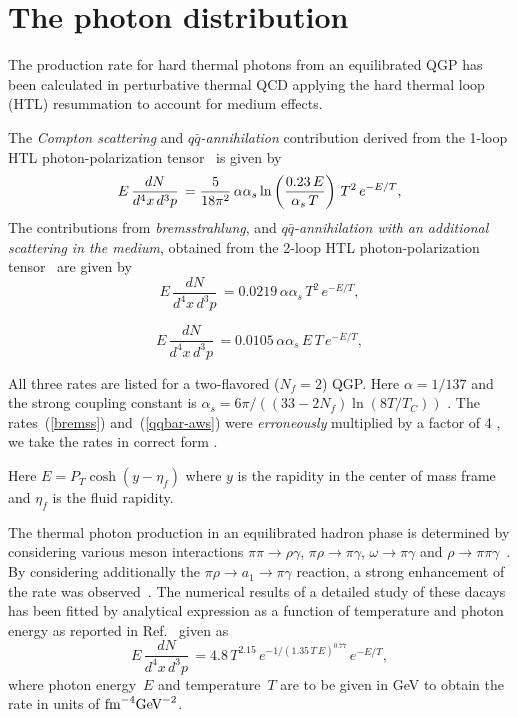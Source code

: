 \documentclass[aps,prc,preprint,superscriptaddress,showpacs,showkeys]{revtex4-1}
\begin{document}
\section{The photon distribution}

  The production rate for hard thermal photons from an equilibrated 
QGP has been calculated in
perturbative thermal QCD applying the hard thermal loop (HTL)
resummation to account for medium effects. 


The {\em Compton scattering} and {\em $q\bar{q}$-annihilation} contribution
derived from the 1-loop HTL photon-polarization 
tensor~\cite{KAPUSTA_1991,BAIER_1991,TRAXLER_1995} is given by
%
\begin{equation} 
 E\,\frac{dN}{d^4x\,d^3p} \, =  {5\over 18 \pi^2}\,\alpha \alpha_s 
       \ln \left(\frac{0.23\,E}{\alpha_s\,T}\right)
            \,T^2\,e^{-E/T},
\label{1-loop}
\end{equation}
%
The contributions from {\em bremsstrahlung}, 
and {\em $q\bar{q}$-annihilation with an additional scattering in the medium},
obtained from the 2-loop HTL photon-polarization
tensor~\cite{AURENCHE_1998,THOMA} are given by
%
\begin{equation} 
   E\,\frac{dN}{d^4x\,d^3p} \, = 
        0.0219\,\alpha \alpha_s
        \,T^2\,e^{-E/T},
\label{bremss}
\end{equation}
%

%
\begin{equation} 
      E\,\frac{dN}{d^4x\,d^3p} \, =  
        0.0105\,\alpha \alpha_s
        \,E\,T\,e^{-E/T},
\label{qqbar-aws}
\end{equation}
%

All three rates are listed for a two-flavored
($N_f = 2$) QGP. Here $\alpha=1/137$ and the strong coupling constant is 
$\alpha_s= 6\pi/((33-2N_f) \ln(8T/T_C))$ \cite{KARSCH}.
The rates~(\ref{bremss}) and~(\ref{qqbar-aws}) were 
{\em erroneously} multiplied 
by a factor of 4 \cite{AURENCHE_1998}, 
we take the rates in correct form \cite{THOMA}.

Here $E=P_T \cosh(y-\eta_f)$ where $y$ is the rapidity in the center
of mass frame and $\eta_f$ is the fluid rapidity.

 The thermal photon production in an equilibrated hadron phase
is determined by considering various meson interactions
$\pi \pi \rightarrow \rho \gamma$, $\pi \rho \rightarrow \pi
\gamma$, $\omega \rightarrow \pi \gamma$ and $\rho
\rightarrow \pi \pi \gamma$~\cite{KAPUSTA_1991,NADEAU_1992}.  By considering
additionally the $\pi \rho \rightarrow a_1 \rightarrow \pi \gamma$ reaction, a
strong enhancement of the rate was observed~\cite{XIONG_1992}. 
 The numerical results of a detailed study of these dacays has been
fitted by analytical expression as a function of temperature and photon
energy as reported in Ref.~\cite{THOMA} given as
%
\begin{equation} 
        E\,\frac{dN}{d^4x\,d^3p} \, = 
        4.8\,T^{2.15}\,e^{-1/(1.35\,T\,E)^{0.77}}\,e^{-E/T},
\label{Markus_suggestion}
\end{equation} 
%
where photon energy~$E$ and temperature~$T$ are to be given in GeV to obtain the
rate in units of $\mbox{fm}^{-4}\mbox{GeV}^{-2}$. 
\end{document}
